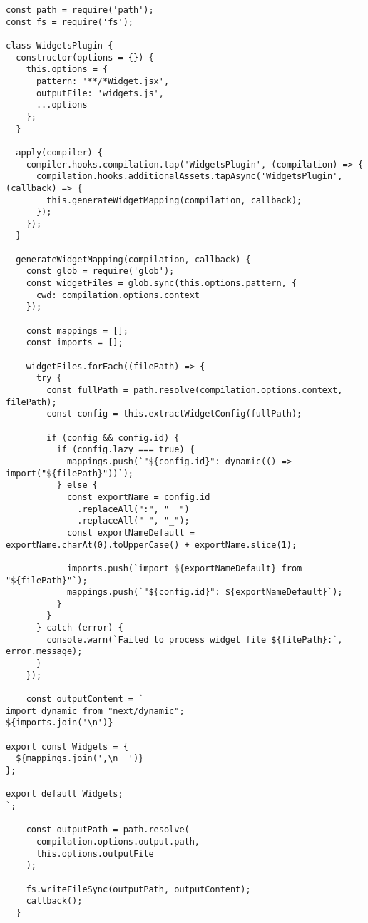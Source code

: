 \begin{lstlisting}[caption={Complete Webpack Widget Plugin Implementation}, captionpos=b, breaklines=true]
const path = require('path');
const fs = require('fs');

class WidgetsPlugin {
  constructor(options = {}) {
    this.options = {
      pattern: '**/*Widget.jsx',
      outputFile: 'widgets.js',
      ...options
    };
  }

  apply(compiler) {
    compiler.hooks.compilation.tap('WidgetsPlugin', (compilation) => {
      compilation.hooks.additionalAssets.tapAsync('WidgetsPlugin', (callback) => {
        this.generateWidgetMapping(compilation, callback);
      });
    });
  }

  generateWidgetMapping(compilation, callback) {
    const glob = require('glob');
    const widgetFiles = glob.sync(this.options.pattern, {
      cwd: compilation.options.context
    });

    const mappings = [];
    const imports = [];

    widgetFiles.forEach((filePath) => {
      try {
        const fullPath = path.resolve(compilation.options.context, filePath);
        const config = this.extractWidgetConfig(fullPath);
        
        if (config && config.id) {
          if (config.lazy === true) {
            mappings.push(`"${config.id}": dynamic(() => import("${filePath}"))`);
          } else {
            const exportName = config.id
              .replaceAll(":", "__")
              .replaceAll("-", "_");
            const exportNameDefault = exportName.charAt(0).toUpperCase() + exportName.slice(1);
            
            imports.push(`import ${exportNameDefault} from "${filePath}"`);
            mappings.push(`"${config.id}": ${exportNameDefault}`);
          }
        }
      } catch (error) {
        console.warn(`Failed to process widget file ${filePath}:`, error.message);
      }
    });

    const outputContent = `
import dynamic from "next/dynamic";
${imports.join('\n')}

export const Widgets = {
  ${mappings.join(',\n  ')}
};

export default Widgets;
`;

    const outputPath = path.resolve(
      compilation.options.output.path,
      this.options.outputFile
    );

    fs.writeFileSync(outputPath, outputContent);
    callback();
  }


\end{lstlisting}
